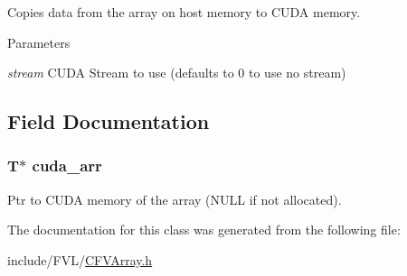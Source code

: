 Copies data from the array on host memory to CUDA memory. 


\begin{DoxyParams}{Parameters}
\item[{\em stream}]CUDA Stream to use (defaults to 0 to use no stream) \end{DoxyParams}


\subsection{Field Documentation}
\hypertarget{classFVL_1_1CFVArray_ac7c2eda2752dff79215dfcc062d0d814}{
\subsubsection[{cuda\_\-arr}]{\setlength{\rightskip}{0pt plus 5cm}T$\ast$ {\bf cuda\_\-arr}}}
\label{dc/d80/classFVL_1_1CFVArray_ac7c2eda2752dff79215dfcc062d0d814}


Ptr to CUDA memory of the array (NULL if not allocated). 



The documentation for this class was generated from the following file:\begin{DoxyCompactItemize}
\item 
include/FVL/\hyperlink{CFVArray_8h}{CFVArray.h}\end{DoxyCompactItemize}
